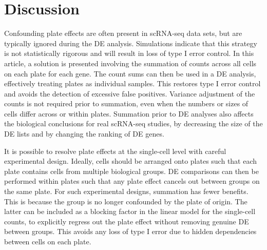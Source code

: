 \documentclass[oupdraft]{bio}
\begin{document}

\section{Discussion}
Confounding plate effects are often present in scRNA-seq data sets, but are typically ignored during the DE analysis.
Simulations indicate that this strategy is not statistically rigorous and will result in loss of type I error control. 
In this article, a solution is presented involving the summation of counts across all cells on each plate for each gene.
The count sums can then be used in a DE analysis, effectively treating plates as individual samples.
This restores type I error control and avoids the detection of excessive false positives.
Variance adjustment of the counts is not required prior to summation, even when the numbers or sizes of cells differ across or within plates.
Summation prior to DE analyses also affects the biological conclusions for real scRNA-seq studies, 
    by decreasing the size of the DE lists and by changing the ranking of DE genes.

It is possible to resolve plate effects at the single-cell level with careful experimental design.
Ideally, cells should be arranged onto plates such that each plate contains cells from multiple biological groups.
DE comparisons can then be performed within plates such that any plate effect cancels out between groups on the same plate.
For such experimental designs, summation has fewer benefits.
This is because the group is no longer confounded by the plate of origin.
The latter can be included as a blocking factor in the linear model for the single-cell counts, 
    to explicitly regress out the plate effect without removing genuine DE between groups.
This avoids any loss of type I error due to hidden dependencies between cells on each plate.
\end{document}
